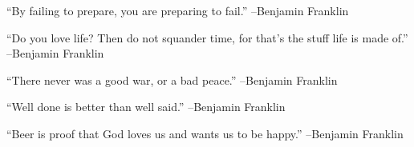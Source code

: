 \documentclass{article}%
\begin{document}
\begin{minipage}{\textwidth}%
\flushleft%
“By failing to prepare, you are preparing to fail.”%
\linebreak%
\vspace{1mm}%
–Benjamin Franklin%
\linebreak%
\vspace{1mm}%
\end{minipage}%
\linebreak%
\vspace{1mm}%
\begin{minipage}{\textwidth}%
\flushleft%
“Do you love life? Then do not squander time, for that's the stuff life is made of.”%
\linebreak%
\vspace{1mm}%
–Benjamin Franklin%
\linebreak%
\vspace{1mm}%
\end{minipage}%
\linebreak%
\vspace{1mm}%
\begin{minipage}{\textwidth}%
\flushleft%
“There never was a good war, or a bad peace.”%
\linebreak%
\vspace{1mm}%
–Benjamin Franklin%
\linebreak%
\vspace{1mm}%
\end{minipage}%
\linebreak%
\vspace{1mm}%
\begin{minipage}{\textwidth}%
\flushleft%
“Well done is better than well said.”%
\linebreak%
\vspace{1mm}%
–Benjamin Franklin%
\linebreak%
\vspace{1mm}%
\end{minipage}%
\linebreak%
\vspace{1mm}%
\begin{minipage}{\textwidth}%
\flushleft%
“Beer is proof that God loves us and wants us to be happy.”%
\linebreak%
\vspace{1mm}%
–Benjamin Franklin%
\linebreak%
\vspace{1mm}%
\end{minipage}%
\linebreak%
\end{document}
